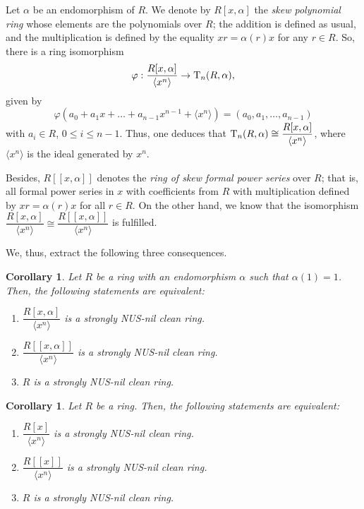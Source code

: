 \documentclass[12pt]{amsart}
\newtheorem{corollary}[theorem]{Corollary}
\theoremstyle{definition}
\begin{document}
Let $\alpha$ be an endomorphism of $R$. We denote by $R[x,\alpha ]$ the {\it skew polynomial ring} whose elements are the polynomials over $R$; the addition is defined as usual, and the multiplication is defined by the equality $xr=\alpha (r)x$ for any $r\in R$. So, there is a ring isomorphism $$\varphi : \dfrac{R[x,\alpha]}{\langle x^{n}\rangle }\rightarrow {\rm T}_{n}(R,\alpha),$$ given by $$\varphi (a_{0}+a_{1}x+\ldots +a_{n-1}x^{n-1}+\langle x^{n} \rangle )=(a_{0},a_{1},\ldots ,a_{n-1})$$ with $a_{i}\in R$, $0\leq i\leq n-1$. Thus, one deduces that ${\rm T}_{n}(R,\alpha )\cong \dfrac{R[x,\alpha ]}{\langle  x^{n}\rangle}$, where $\langle x^{n}\rangle$ is the ideal generated by $x^{n}$.

Besides, $R[[x, \alpha]]$ denotes the {\it ring of skew formal power series} over $R$; that is, all formal power series in $x$ with coefficients from $R$ with multiplication defined by $xr = \alpha(r)x$ for all $r \in R$. On the other hand, we know that the isomorphism $\dfrac{R[x,\alpha ]}{\langle x^{n}\rangle}\cong \dfrac{R[[x,\alpha ]]}{\langle x^{n}\rangle}$ is fulfilled.

\medskip

We, thus, extract the following three consequences.

\begin{corollary}\label{2.21}
Let $R$ be a ring with an endomorphism $\alpha$ such that $\alpha (1)=1$. Then, the following statements are equivalent:
\begin{enumerate}
\item
$\dfrac{R[x,\alpha ]}{\langle x^{n}\rangle }$ is a strongly NUS-nil clean ring.
\item
$\dfrac{R[[x,\alpha ]]}{\langle x^{n}\rangle }$ is a strongly NUS-nil clean ring.
\item
$R$ is a strongly NUS-nil clean ring.
\end{enumerate}
\end{corollary}

\begin{corollary}
Let $R$ be a ring. Then, the following statements are equivalent:
\begin{enumerate}
\item
$\dfrac{R[x]}{\langle x^{n}\rangle }$ is a strongly NUS-nil clean ring.
\item
$\dfrac{R[[x]]}{\langle x^{n}\rangle }$ is a strongly NUS-nil clean ring.
\item
$R$ is a strongly NUS-nil clean ring.
\end{enumerate}
\end{corollary}
\end{document}
